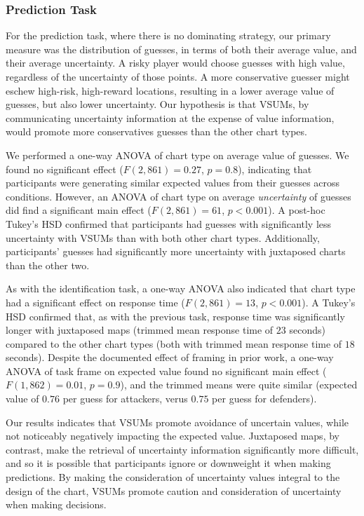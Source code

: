 \documentclass{vgtc}                          %
\begin{document}
\subsubsection{Prediction Task}

For the prediction task, where there is no dominating strategy, our primary measure was the distribution of guesses, in terms of both their average value, and their average uncertainty. A risky player would choose guesses with high value, regardless of the uncertainty of those points. A more conservative guesser might eschew high-risk, high-reward locations, resulting in a lower average value of guesses, but also lower uncertainty. Our hypothesis is that VSUMs, by communicating uncertainty information at the expense of value information, would promote more conservatives guesses than the other chart types.

We performed a one-way ANOVA of chart type on average value of guesses. We found no significant effect ($F(2,861)=0.27$, $p=0.8$), indicating that participants were generating similar expected values from their guesses across conditions. However, an ANOVA of chart type on average \emph{uncertainty} of guesses did find a significant main effect ($F(2,861)=61$, $p<0.001$). A post-hoc Tukey's HSD confirmed that participants had guesses with significantly less uncertainty with VSUMs than with both other chart types. Additionally, participants' guesses had significantly more uncertainty with juxtaposed charts than the other two. 

As with the identification task, a one-way ANOVA also indicated that chart type had a significant effect on response time ($F(2,861)=13$, $p<0.001$). A Tukey's HSD confirmed that, as with the previous task, response time was significantly longer with juxtaposed maps (trimmed mean response time of $23$ seconds) compared to the other chart types (both with trimmed mean response time of $18$ seconds). Despite the documented effect of framing in prior work, a one-way ANOVA of task frame on expected value found no significant main effect ($F(1,862)=0.01$, $p=0.9$), and the trimmed means were quite similar (expected value of $0.76$ per guess for attackers, verus $0.75$ per guess for defenders).

Our results indicates that VSUMs promote avoidance of uncertain values, while not noticeably negatively impacting the expected value. Juxtaposed maps, by contrast, make the retrieval of uncertainty information significantly more difficult, and so it is possible that participants ignore or downweight it when making predictions. By making the consideration of uncertainty values integral to the design of the chart, VSUMs promote caution and consideration of uncertainty when making decisions.
\end{document}

